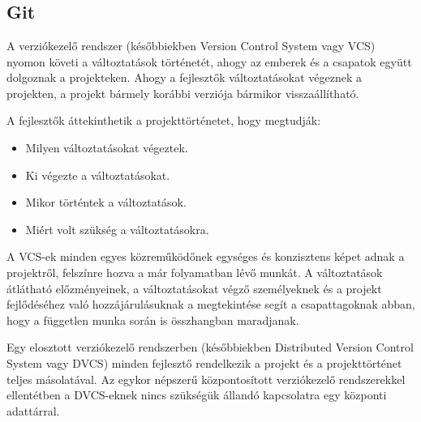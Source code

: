 \chapter{\github}
\section{Git}
A verziókezelő rendszer (későbbiekben Version Control System vagy VCS) nyomon követi a változtatások történetét, ahogy az emberek és a csapatok együtt dolgoznak a projekteken.
Ahogy a fejlesztők változtatásokat végeznek a projekten, a projekt bármely korábbi verziója bármikor visszaállítható.

A fejlesztők áttekinthetik a projekttörténetet, hogy megtudják:
\begin{itemize}
  \item Milyen változtatásokat végeztek.
  \item Ki végezte a változtatásokat.
  \item Mikor történtek a változtatások.
  \item Miért volt szükség a változtatásokra.
\end{itemize}

A VCS-ek minden egyes közreműködőnek egységes és konzisztens képet adnak a projektről, felszínre hozva a már folyamatban lévő munkát.
A változtatások átlátható előzményeinek, a változtatásokat végző személyeknek és a projekt fejlődéséhez való hozzájárulásuknak a megtekintése segít a csapattagoknak abban, hogy a független munka során is összhangban maradjanak.

Egy elosztott verziókezelő rendszerben (későbbiekben Distributed Version Control System vagy DVCS) minden fejlesztő rendelkezik a projekt és a projekttörténet teljes másolatával.
Az egykor népszerű központosított verziókezelő rendszerekkel ellentétben a DVCS-eknek nincs szükségük állandó kapcsolatra egy központi adattárral.

\newpage

